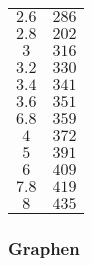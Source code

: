 \begin{center}
\begin{tabular}{c c}
\(2.6\) & \( 286\) \\ 
\(2.8\) & \( 202\) \\ 
\(3\) & \( 316\) \\ 
\(3.2\) & \( 330\) \\ 
\(3.4\) & \( 341\) \\ 
\(3.6\) & \( 351\) \\ 
\(6.8\) & \( 359\) \\ 
\(4\) & \( 372\) \\ 
\(5\) & \( 391\) \\ 
\(6\) & \( 409\) \\ 
\(7.8\) & \( 419\) \\ 
\(8\) & \( 435\) \\
\end{tabular}
\end{center}
\subsubsection{Graphen}
